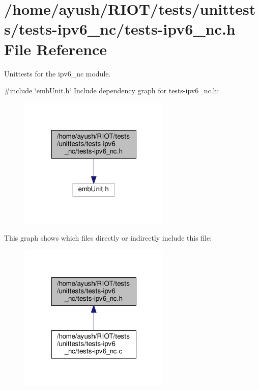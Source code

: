 \hypertarget{tests-ipv6__nc_8h}{}\section{/home/ayush/\+R\+I\+O\+T/tests/unittests/tests-\/ipv6\+\_\+nc/tests-\/ipv6\+\_\+nc.h File Reference}
\label{tests-ipv6__nc_8h}


Unittests for the {\ttfamily ipv6\+\_\+nc} module.  


{\ttfamily \#include \char`\"{}emb\+Unit.\+h\char`\"{}}\newline
Include dependency graph for tests-\/ipv6\+\_\+nc.h\+:
\nopagebreak
\begin{figure}[H]
\begin{center}
\leavevmode
\includegraphics[width=205pt]{tests-ipv6__nc_8h__incl}
\end{center}
\end{figure}
This graph shows which files directly or indirectly include this file\+:
\nopagebreak
\begin{figure}[H]
\begin{center}
\leavevmode
\includegraphics[width=205pt]{tests-ipv6__nc_8h__dep__incl}
\end{center}
\end{figure}
